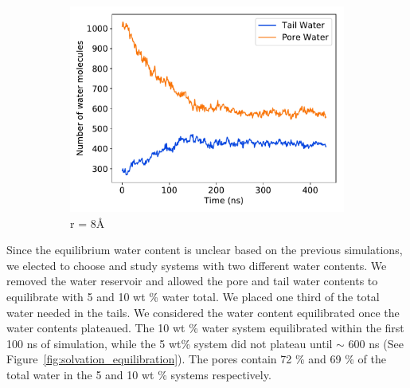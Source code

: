 \documentclass{article}
\begin{document}
\begin{figure}
\begin{subfigure}{0.45\textwidth}
  \includegraphics[width=\linewidth]{r8_gap.pdf}
  \caption{r = 8\AA}\label{fig:r8_gap}
  \end{subfigure}
  \caption{}\label{fig:gap_prefilled_equil}
  \end{figure}

  Since the equilibrium water content is unclear based on the previous
  simulations, we elected to choose and study systems with two different water
  contents. We removed the water reservoir and allowed the pore and tail water
  contents to equilibrate with 5 and 10 wt \% water total. We placed one third of
  the total water needed in the tails. We considered the water content
  equilibrated once the water contents plateaued. The 10 wt \% water system
  equilibrated within the first 100 ns of simulation, while the 5 wt\% system did
  not plateau until $\sim$ 600 ns (See Figure~\ref{fig:solvation_equilibration}).
  The pores contain 72 \% and 69 \% of the total water in the 5 and 10 wt \%
  systems respectively.
\end{document}

